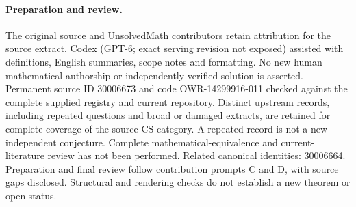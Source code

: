 \documentclass[11pt]{article}
\begin{document}
\paragraph{Preparation and review.}
The original source and UnsolvedMath contributors retain attribution for the source extract. Codex (GPT-6; exact serving revision not exposed) assisted with definitions, English summaries, scope notes and formatting. No new human mathematical authorship or independently verified solution is asserted. Permanent source ID 30006673 and code OWR-14299916-011 checked against the complete supplied registry and current repository. Distinct upstream records, including repeated questions and broad or damaged extracts, are retained for complete coverage of the source CS category. A repeated record is not a new independent conjecture. Complete mathematical-equivalence and current-literature review has not been performed. Related canonical identities: 30006664. Preparation and final review follow contribution prompts C and D, with source gaps disclosed. Structural and rendering checks do not establish a new theorem or open status.
\label{end:30006673}
\end{document}
